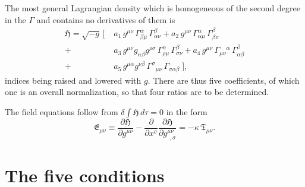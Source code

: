 \documentclass[aps,prd,reprint,amsmath,amssymb,nofootinbib,longbibliography]{revtex4-2}
\newcommand{\Gam}[3]{\Gamma^{#1}_{#2#3}}
\begin{document}
The most general Lagrangian density which is homogeneous of the second degree in the
$\Gamma$ and contains no derivatives of them is
\begin{align}
\mathfrak{H} = \sqrt{-g}\,\Big[\;
   & a_1\, g^{\mu\nu}\, \Gam{\alpha}{\beta}{\mu}\, \Gam{\beta}{\alpha}{\nu}
 + a_2\, g^{\mu\nu}\, \Gam{\alpha}{\alpha}{\mu}\, \Gam{\beta}{\beta}{\nu} \nonumber\\
 + & a_3\, g^{\mu\nu} g_{\alpha\beta} g^{\rho\sigma}\,
       \Gam{\alpha}{\rho}{\mu}\, \Gam{\beta}{\sigma}{\nu}
 + a_4\, g^{\mu\nu}\, \Gamma_{\mu\nu}{}^{\alpha}\, \Gam{\beta}{\alpha}{\beta} \nonumber\\
 + & a_5\, g^{\mu\alpha} g^{\nu\beta}\, \Gamma^{\sigma}{}_{\mu\nu}\, \Gamma_{\sigma\alpha\beta}
 \;\Big] ,
\label{eq:H}
\end{align}
indices being raised and lowered with $g$. There are thus five coefficients, of which one is an
overall normalization, so that four ratios are to be determined.

The field equations follow from $\delta \int \mathfrak{H}\, d\tau = 0$ in the form
\begin{equation}
\mathfrak{E}_{\mu\nu} \equiv \frac{\partial \mathfrak{H}}{\partial g^{\mu\nu}}
 - \frac{\partial}{\partial x^{\sigma}}
   \frac{\partial \mathfrak{H}}{\partial g^{\mu\nu}_{\ \ ,\sigma}}
 = -\kappa\, \mathfrak{T}_{\mu\nu} .
\label{eq:field}
\end{equation}

\section{The five conditions}
\label{sec:cond}
\end{document}
